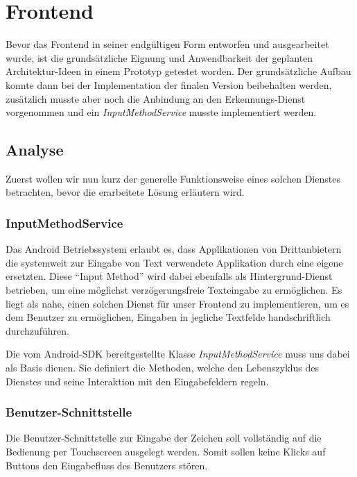 \chapter{Frontend}

Bevor das Frontend in seiner endgültigen Form entworfen und ausgearbeitet wurde, ist die grundsätzliche Eignung und Anwendbarkeit der geplanten Architektur-Ideen in einem Prototyp getestet worden. Der grundsätzliche Aufbau konnte dann bei der Implementation der finalen Version beibehalten werden, zusätzlich musste aber noch die Anbindung an den Erkennungs-Dienst vorgenommen und ein \emph{InputMethodService} musste implementiert werden.

\section{Analyse}

Zuerst wollen wir nun kurz der generelle Funktionsweise eines solchen Dienstes betrachten, bevor die erarbeitete Lösung erläutern wird.

\subsection{InputMethodService}

Das Android Betriebssystem erlaubt es, dass Applikationen von Drittanbietern die systemweit zur Eingabe von Text verwendete Applikation durch eine eigene ersetzten. Diese ``Input Method'' wird dabei ebenfalls als Hintergrund-Dienst betrieben, um eine möglichst verzögerungsfreie Texteingabe zu ermöglichen. Es liegt als nahe, einen solchen Dienst für unser Frontend zu implementieren, um es dem Benutzer zu ermöglichen, Eingaben in jegliche Textfelde handschriftlich durchzuführen. \cite{adg_ime}

Die vom Android-SDK bereitgestellte Klasse \emph{InputMethodService} muss uns dabei als Basis dienen. Sie definiert die Methoden, welche den Lebenszyklus des Dienstes und seine Interaktion mit den Eingabefeldern regeln.

\subsection{Benutzer-Schnittstelle}

Die Benutzer-Schnittstelle zur Eingabe der Zeichen soll vollständig auf die Bedienung per Touchscreen ausgelegt werden. Somit sollen keine Klicks auf Buttons den Eingabefluss des Benutzers stören.

